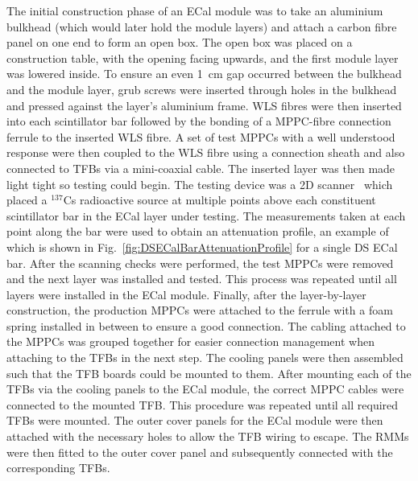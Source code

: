 {The initial construction phase of an ECal module was to take an aluminium bulkhead (which would later hold the module layers) and attach a carbon fibre panel on one end to form an open box.  The open box was placed on a construction table, with the opening facing upwards, and the first module layer was lowered inside.  To ensure an even 1~cm gap occurred between the bulkhead and the module layer, grub screws were inserted through holes in the bulkhead and pressed against the layer's aluminium frame.  WLS fibres were then inserted into each scintillator bar followed by the bonding of a MPPC-fibre connection ferrule to the inserted WLS fibre.  A set of test MPPCs with a well understood response were then coupled to the WLS fibre using a connection sheath and also connected to TFBs via a mini-coaxial cable.  The inserted layer was then made light tight so testing could begin.  The testing device was a 2D scanner~\cite{1748-0221-8-10-P10019} which placed a $^{137}$Cs radioactive source at multiple points above each constituent scintillator bar in the ECal layer under testing.  The measurements taken at each point along the bar were used to obtain an attenuation profile, an example of which is shown in Fig.~\ref{fig:DSECalBarAttenuationProfile} for a single DS ECal bar.  After the scanning checks were performed, the test MPPCs were removed and the next layer was installed and tested.  This process was repeated until all layers were installed in the ECal module.  Finally, after the layer-by-layer construction, the production MPPCs were attached to the ferrule with a foam spring installed in between to ensure a good connection.  The cabling attached to the MPPCs was grouped together for easier connection management when attaching to the TFBs in the next step.  The cooling panels were then assembled such that the TFB boards could be mounted to them. After mounting each of the TFBs via the cooling panels to the ECal module, the correct MPPC cables were connected to the mounted TFB.  This procedure was repeated until all required TFBs were mounted.  The outer cover panels for the ECal module were then attached with the necessary holes to allow the TFB wiring to escape.  The RMMs were then fitted to the outer cover panel and subsequently connected with the corresponding TFBs}.
